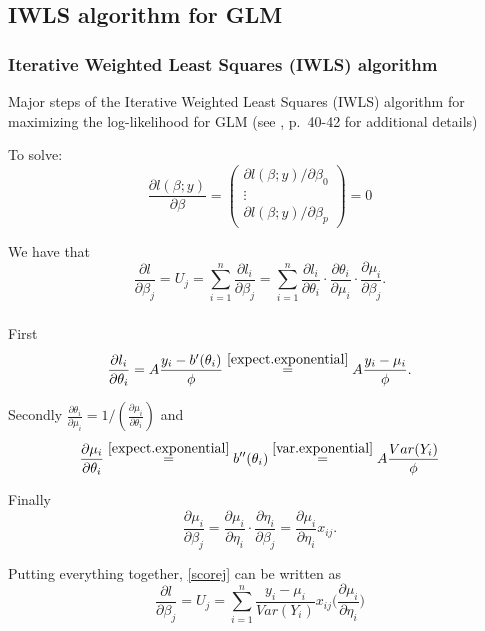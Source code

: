 \documentclass{beamer}
\newcommand{\bs}{\bigskip}
\begin{document}
\subsection{IWLS algorithm for GLM}

\begin{frame}
\frametitle{ Iterative Weighted Least Squares (IWLS) algorithm}

Major steps of the {\color{blue} Iterative Weighted Least Squares (IWLS)}
algorithm for maximizing the log-likelihood for GLM (see ,
p.\ 40-42 for additional details) 

\bs
To solve:
$$\frac{\partial l(\beta;y)}{\partial \beta} =  \left(
\begin{array}{c}
\partial l(\beta;y)/\partial \beta_0\\
\vdots\\
\partial l(\beta;y)/\partial \beta_p
\end{array} \right) = 0$$

We have that
\begin{equation}
\label{scorej}
\frac{\partial l}{\partial \beta_j} = U_j = \sum_{i=1}^n
  \frac{\partial l_i}{\partial
  \beta_j} = \sum_{i=1}^n \frac{\partial l_i}{\partial \theta_i} \cdot
  \frac{\partial \theta_i}{\partial \mu_i} \cdot \frac{\partial
  \mu_i}{\partial \beta_j}.
\end{equation}
\end{frame}

\begin{frame}
\frametitle{}
First
$$\frac{\partial l_i}{\partial \theta_i} = A \frac{y_i -
b^{\prime}(\theta_i)}{\phi} \stackrel{\eqref{expect.exponential}}{=}
 A \frac{y_i-\mu_i}{\phi}.$$

\bs

Secondly $\frac{\partial \theta_i}{\partial \mu_i} = 1/(\frac{\partial
  \mu_i}{\partial \theta_i})$
and
$$\frac{\partial \mu_i}{\partial \theta_i}
\stackrel{\eqref{expect.exponential}}{=} b^{\prime \prime}(\theta_i)
\stackrel{\eqref{var.exponential}}{=} A \frac{Var(Y_i)}{\phi}$$

\bs
Finally
$$\frac{\partial \mu_i}{\partial \beta_j}=
\frac{\partial \mu_i}{\partial \eta_i} \cdot \frac{\partial
  \eta_i}{\partial\beta_j} = \frac{\partial \mu_i}{\partial \eta_i}
x_{ij}.$$

\bs

Putting everything together, \eqref{scorej} can be written as
$$\frac{\partial l}{\partial \beta_j} = U_j = \sum_{i=1}^n
\frac{y_i-\mu_i}{Var(Y_i)} x_{ij} \Big(\frac{\partial \mu_i}{\partial
  \eta_i}\Big)$$
\label{EE.GLM}
\end{frame}
\end{document}
